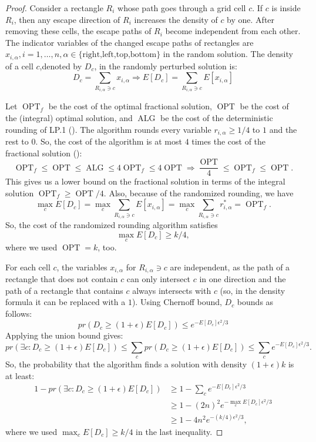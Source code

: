 \documentclass[preprint,12pt]{elsarticle}
\DeclareMathOperator{\OPT}{OPT}
\DeclareMathOperator{\ALG}{ALG}
\begin{document}
\begin{proof}
Consider a rectangle $R_i$ whose path goes through a grid cell $c$. If $c$ is inside $R_i$, then any escape direction of $R_i$ increases the density of $c$ by one. After removing these cells, the escape paths of $R_i$ become independent from each other.
The indicator variables of the changed escape paths of rectangles are $x_{i,\alpha}, i=1,\ldots,n, \alpha\in \{\text{right,left,top,bottom}\}$ in the random solution.
%
The density of a cell $c$,denoted by $D_c$, in the randomly perturbed solution is:
\[
D_c=\sum_{R_{i,\alpha}\ni c} x_{i,\alpha} \Rightarrow
E[D_c] =\sum_{R_{i,\alpha}\ni c} E[x_{i,\alpha}]
\]

Let $\OPT_f$ be the cost of the optimal fractional solution, $\OPT$ be the cost of the (integral) optimal solution, and $\ALG$ be the cost of the deterministic rounding of LP.1 (). The algorithm rounds every variable $r_{i,\alpha}\geq 1/4$ to $1$ and the rest to $0$. So, the cost of the algorithm is at most $4$ times the cost of the fractional solution ():
\[
\OPT_f \leq \OPT \leq \ALG \leq 4\OPT_f \leq 4\OPT \Rightarrow \frac{\OPT}{4} \leq \OPT_f\leq \OPT.
\]
This gives us a lower bound on the fractional solution in terms of the integral solution $\OPT_f \geq \OPT/4$. Also, because of the randomized rounding, we have
\[
\max_{c} E[D_c] =\max_c \sum_{R_{i,\alpha}\ni c} E[x_{i,\alpha}]=\max_c \sum_{R_{i,\alpha}\ni c} r^*_{i,\alpha}=\OPT_f.
\]
So, the cost of the randomized rounding algorithm satisfies
\[
\max_{c} E[D_c]\geq k/4,
\]
where we used $\OPT=k$, too.

For each cell $c$, the variables $x_{i,\alpha}$ for $R_{i,\alpha}\ni c$ are independent, as the path of a rectangle that does not contain $c$ can only intersect $c$ in one direction and the path of a rectangle that contains $c$ always intersects with $c$ (so, in the density formula it can be replaced with a $1$).
Using Chernoff bound, $D_c$ bounds as follows:
\[
pr(D_c\geq (1+\epsilon)E[D_c]) \leq e^{-E[D_c]\epsilon^2/3}
\]
Applying the union bound gives:
\[
pr(\exists c: D_c \geq (1+\epsilon)E[D_c])
\leq \sum_c pr(D_c \geq (1+\epsilon)E[D_c])
\leq \sum_c e^{-E[D_c]\epsilon^2/3}.\]
So, the probability that the algorithm finds a solution with density $(1+\epsilon)k$ is at least:
\begin{align*}
1-pr(\exists c: D_c \geq (1+\epsilon)E[D_c])&\geq 1- \sum_c e^{-E[D_c]\epsilon^2/3}\\
&\geq 1-(2n)^2 e^{-\max_c E[D_c]\epsilon^2/3}\\
&\geq1- 4n^2 e^{-(k/4)\epsilon^2/3},
\end{align*}
where we used $\max_c E[D_c]\geq k/4$ in the last inequality.


\end{proof}
\end{document}
